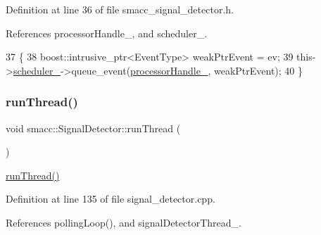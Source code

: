 Definition at line 36 of file smacc\+\_\+signal\+\_\+detector.\+h.



References processor\+Handle\+\_\+, and scheduler\+\_\+.


\begin{DoxyCode}
37     \{
38         boost::intrusive\_ptr<EventType> weakPtrEvent = ev;
39         this->\hyperlink{classsmacc_1_1SignalDetector_adaee5b9b91d0e6305dc1ab30f7ab566d}{scheduler\_}->queue\_event(\hyperlink{classsmacc_1_1SignalDetector_a9a77dc9f0e9f8f56dff5e76077abcb78}{processorHandle\_}, weakPtrEvent);
40     \}
\end{DoxyCode}
\mbox{\label{classsmacc_1_1SignalDetector_a48b3fee853ddcb25732408b22ecfcf39}} 
\subsubsection{\texorpdfstring{run\+Thread()}{runThread()}}
{\footnotesize\ttfamily void smacc\+::\+Signal\+Detector\+::run\+Thread (\begin{DoxyParamCaption}{ }\end{DoxyParamCaption})}

\hyperlink{classsmacc_1_1SignalDetector_a48b3fee853ddcb25732408b22ecfcf39}{run\+Thread()} 

Definition at line 135 of file signal\+\_\+detector.\+cpp.



References polling\+Loop(), and signal\+Detector\+Thread\+\_\+.


